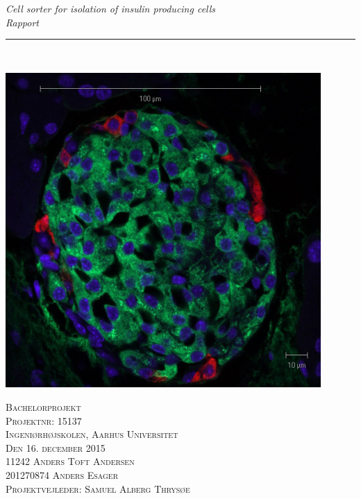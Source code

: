 \thispagestyle{empty}
\begin{center}
\vspace{3cm}

\phantom{hul}

\phantom{hul}

\phantom{hul}

\textsl{\LARGE Cell sorter for isolation of insulin producing cells} \\ \vspace{0.25cm}
\textsl{\Large Rapport} \\ %

\rule{13cm}{3mm} \\ \vspace{1cm}

\includegraphics[width=0.9\textwidth]{billeder/forside.jpg}

\textsc{\center Bachelorprojekt \\
Projektnr: 15137 \\
Ingeniørhøjskolen, Aarhus Universitet \\
Den 16. december 2015 \\ \vspace{1cm}
11242	Anders Toft Andersen \\
201270874	Anders Esager \\
Projektvejleder: Samuel Alberg Thrysøe \\}
\end{center}
